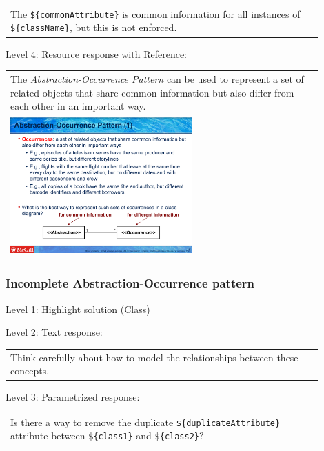 \begin{tabular}{|p{0.9\linewidth}}
The \verb|${commonAttribute}| is common information for all instances of \verb|${className}|, but this is not enforced.
\end{tabular} \medskip

\noindent Level 4: Resource response with Reference: \medskip

\begin{tabular}{|p{0.9\linewidth}}
The \textit{Abstraction-Occurrence Pattern} can be used to 
represent a set of related objects that share common information but also differ
from each other in an important way.

\\
\includegraphics[width=0.6\textwidth]{images/abstraction_occurrence.png}
\end{tabular} \medskip


\subsubsection{Incomplete Abstraction-Occurrence pattern}

\noindent Level 1: Highlight solution (Class) \medskip

\noindent Level 2: Text response: \medskip

\begin{tabular}{|p{0.9\linewidth}}
Think carefully about how to model the relationships between these concepts.
\end{tabular} \medskip

\noindent Level 3: Parametrized response: \medskip

\begin{tabular}{|p{0.9\linewidth}}
Is there a way to remove the duplicate \verb|${duplicateAttribute}| attribute between \verb|${class1}| and \verb|${class2}|?
\end{tabular} \medskip


